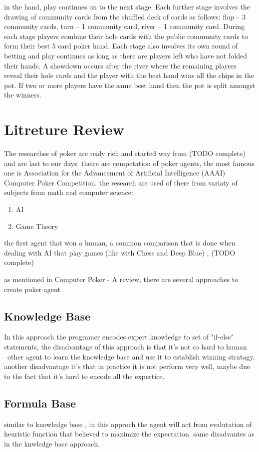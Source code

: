 \documentclass{article}
\begin{document}
in the hand, play continues on to the next stage. Each further stage involves the drawing of community cards from the
shuffled deck of cards as follows: flop – 3 community cards, turn – 1 community card, river – 1 community card.
During each stage players combine their hole cards with the public community cards to form their best 5 card poker
hand. Each stage also involves its own round of betting and play continues as long as there are players left who have not
folded their hands. A showdown occurs after the river where the remaining players reveal their hole cards and the player
with the best hand wins all the chips in the pot. If two or more players have the same best hand then the pot is split
amongst the winners.
\section{Litreture Review}
The researches of poker are realy rich and started way from (TODO complete) and are last to our days.
theire are competation of poker agents, the most famous one is Association for the Advancement of Artificial Intelligence (AAAI) Computer Poker Competition.
the research are used of there from variaty of subjects from math and computer science:
\begin{enumerate}
\item AI
\item Game Theory
\end{enumerate}
the first agent that won a human, a common comparison that is done when dealing with AI that play games (like with Chess and Deep Blue) , (TODO complete)

as mentioned in Computer Poker - A review, there are several approaches to create poker agent\\
\subsection{Knowledge Base}
In this approach the programer encodes expert knowledge to set of "if-else" statements, the disadvantage of this approach is that it's not so hard to human \ other agent to learn the knowledge base and use it to establish winning stratagy. another disadvantage it's that in practice it is not perform very well, maybe due to the fact that it's hard to encode all the expertice.
\subsection{Formula Base}
similar to knowledge base , in this approch the agent will act from evalutation of heuristic function that believed to maximize the expectation.
same disadvantes as in the knwledge base approach.
\end{document}
